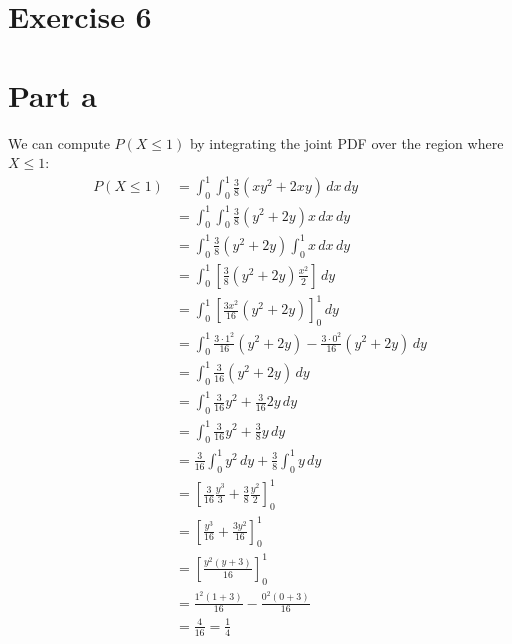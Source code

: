 \section{Exercise 6}

\section{Part a}

We can compute $P(X\leq 1)$ by integrating the joint PDF over the region where $X\leq 1$:
\begin{align*}
	P(X\leq 1) & = \int_{0}^{1}\int_{0}^{1} \frac{3}{8}(xy^2+2xy) \,dx\,dy                        \\
	           & = \int_{0}^{1}\int_{0}^{1} \frac{3}{8}(y^2+2y)x \,dx\,dy                         \\
	           & = \int_{0}^{1} \frac{3}{8}(y^2+2y)\int_{0}^{1}x \,dx\,dy                         \\
	           & = \int_{0}^{1} \left[\frac{3}{8}(y^2+2y)\frac{x^2}{2} \right]\,dy                \\
	           & = \int_{0}^{1} \left[\frac{3x^2}{16}(y^2+2y) \right]^1_0\,dy                     \\
	           & = \int_{0}^{1} \frac{3\cdot 1^2}{16}(y^2+2y) - \frac{3\cdot 0^2}{16}(y^2+2y)\,dy \\
	           & = \int_{0}^{1} \frac{3}{16}(y^2+2y)\,dy                                          \\
	           & = \int_{0}^{1} \frac{3}{16}y^2+\frac{3}{16}2y\,dy                                \\
	           & = \int_{0}^{1} \frac{3}{16}y^2+\frac{3}{8}y\,dy                                  \\
	           & = \frac{3}{16}\int_{0}^{1} y^2\,dy+\frac{3}{8}\int_{0}^{1} y\,dy                 \\
	           & = \left[\frac{3}{16}\frac{y^3}{3} + \frac{3}{8}\frac{y^2}{2}\right]^1_0          \\
	           & = \left[\frac{y^3}{16} + \frac{3y^2}{16}\right]^1_0                              \\
	           & = \left[\frac{y^2\left(y + 3\right)}{16}\right]^1_0                              \\
	           & = \frac{1^2\left(1 + 3\right)}{16} - \frac{0^2\left(0 + 3\right)}{16}            \\
	           & = \frac{4}{16}  = \frac{1}{4}                                                    \\
\end{align*}
